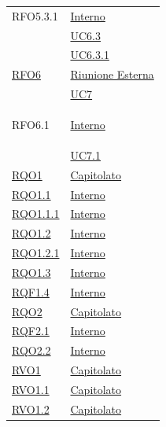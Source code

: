 \begin{longtable}{|>{\centering}m{5cm}|m{5cm}<{\centering}|}
\hypertarget{RFO5.3.1}{RFO5.3.1} &  \hyperlink{Interno}{Interno}\\
& \hyperref[UC6.3]{UC6.3}\\ 
& \hyperref[UC6.3.1]{UC6.3.1}\\ \hline

\hyperlink{RFO6}{RFO6} & \hyperlink{Riunione Esterna}{Riunione Esterna}\\
& \hyperref[UC7]{UC7}\\ \hline

\hypertarget{RFO6.1}{RFO6.1} & \hyperlink{Interno}{Interno}\\
& \hyperref[UC7.1]{UC7.1}\\ \hline

\hyperlink{RQO1}{RQO1} & \hyperlink{Capitolato}{Capitolato}\\ \hline

\hyperlink{RQO1.1}{RQO1.1} & \hyperlink{Interno}{Interno}\\ \hline

\hyperlink{RQO1.1.1}{RQO1.1.1} & \hyperlink{Interno}{Interno}\\ \hline

\hyperlink{RQO1.2}{RQO1.2} & \hyperlink{Interno}{Interno}\\ \hline

\hyperlink{RQO1.2.1}{RQO1.2.1} & \hyperlink{Interno}{Interno}\\ \hline

\hyperlink{RQO1.3}{RQO1.3} & \hyperlink{Interno}{Interno}\\ \hline

\hyperlink{RQF1.4}{RQF1.4} & \hyperlink{Interno}{Interno}\\ \hline

\hyperlink{RQO2}{RQO2} & \hyperlink{Capitolato}{Capitolato}\\ \hline

\hyperlink{RQF2.1}{RQF2.1} & \hyperlink{Interno}{Interno}\\ \hline

\hyperlink{RQO2.2}{RQO2.2} & \hyperlink{Interno}{Interno}\\ \hline

\hyperlink{RVO1}{RVO1} & \hyperlink{Capitolato}{Capitolato}\\ \hline

\hyperlink{RVO1.1}{RVO1.1} & \hyperlink{Capitolato}{Capitolato}\\ \hline

\hyperlink{RVO1.2}{RVO1.2} & \hyperlink{Capitolato}{Capitolato}\\ \hline


\end{longtable}
